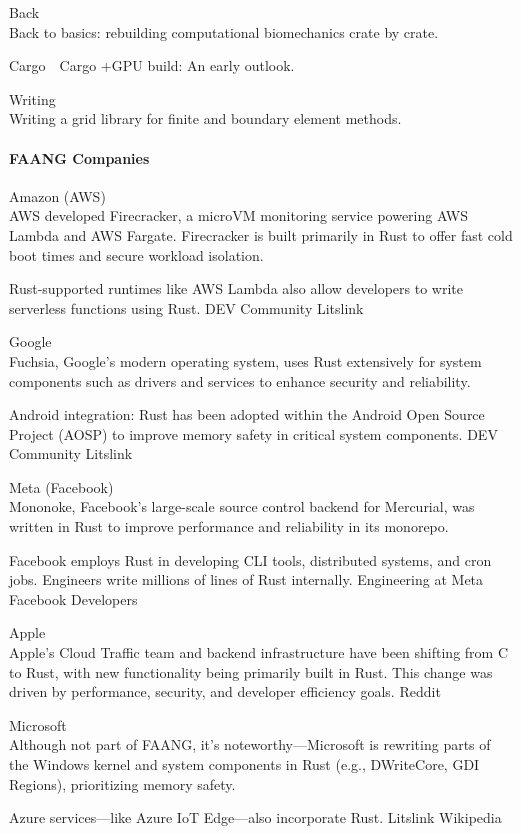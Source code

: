 \documentclass{article}
\begin{document}
Back\\
Back to basics: rebuilding computational biomechanics crate by crate.

Cargo\ \ Cargo +GPU build: An early outlook.

Writing\\
Writing a grid library for finite and boundary element methods.

\paragraph{FAANG Companies}

Amazon (AWS)\\
AWS developed Firecracker, a microVM monitoring service powering AWS Lambda and AWS Fargate.
Firecracker is built primarily in Rust to offer fast cold boot times and secure workload isolation.

Rust-supported runtimes like AWS Lambda also allow developers to write serverless functions using
Rust. DEV Community Litslink

Google\\
Fuchsia, Google's modern operating system, uses Rust extensively for system components such as
drivers and services to enhance security and reliability.

Android integration: Rust has been adopted within the Android Open Source Project (AOSP) to improve
memory safety in critical system components. DEV Community Litslink

Meta (Facebook)\\
Mononoke, Facebook’s large-scale source control backend for Mercurial, was written in Rust to
improve performance and reliability in its monorepo.

Facebook employs Rust in developing CLI tools, distributed systems, and cron jobs. Engineers write
millions of lines of Rust internally. Engineering at Meta Facebook Developers

Apple\\
Apple’s Cloud Traffic team and backend infrastructure have been shifting from C to Rust, with new
functionality being primarily built in Rust. This change was driven by performance, security, and
developer efficiency goals. Reddit

Microsoft\\
Although not part of FAANG, it’s noteworthy—Microsoft is rewriting parts of the Windows kernel and
system components in Rust (e.g., DWriteCore, GDI Regions), prioritizing memory safety.

Azure services—like Azure IoT Edge—also incorporate Rust. Litslink Wikipedia
\end{document}
